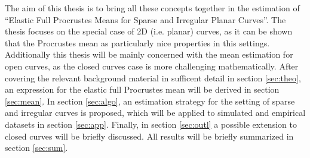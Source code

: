 The aim of this thesis is to bring all these concepts together in the
estimation of \enquote{Elastic Full Procrustes Means for Sparse and Irregular
Planar Curves}. 
The thesis focuses on the special case of 2D (i.e. planar) curves, as it can be
shown that the Procrustes mean as particularly nice properties in this
settings.
Additionally this thesis will be mainly concerned with the mean estimation for
open curves, as the closed curves case is more challenging mathematically.
After covering the relevant background material in sufficent detail in section
\ref{sec:theo}, an expression for the elastic full Procrustes mean will be
derived in section \ref{sec:mean}.
In section \ref{sec:algo}, an estimation strategy for the setting of sparse and
irregular curves is proposed, which will be applied to simulated and empirical
datasets in section \ref{sec:app}.
Finally, in section \ref{sec:outl} a possible extension to closed curves will
be briefly discussed.
All results will be briefly summarized in section \ref{sec:sum}.

\newpage
